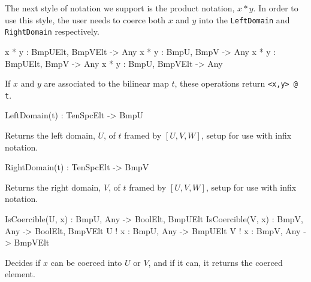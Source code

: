 The next style of notation we support is the product notation, $x*y$.
In order to use this style, the user needs to coerce both $x$ and $y$ into the \texttt{LeftDomain} and \texttt{RightDomain} respectively. 

\begin{intrinsics}
x * y : BmpUElt, BmpVElt -> Any
x * y : BmpU, BmpV -> Any
x * y : BmpUElt, BmpV -> Any
x * y : BmpU, BmpVElt -> Any
\end{intrinsics}

If $x$ and $y$ are associated to the bilinear map $t$, these operations return 
\texttt{<x,y> @ t}.

\begin{intrinsics}
LeftDomain(t) : TenSpcElt -> BmpU
\end{intrinsics}

Returns the left domain, $U$, of $t$ framed by $[U,V,W]$, 
setup for use with infix notation.

\begin{intrinsics}
RightDomain(t) : TenSpcElt -> BmpV
\end{intrinsics}

Returns the right domain, $V$, of $t$ framed by $[U,V,W]$,
setup for use with infix notation.

\begin{intrinsics}
IsCoercible(U, x) : BmpU, Any -> BoolElt, BmpUElt
IsCoercible(V, x) : BmpV, Any -> BoolElt, BmpVElt
U ! x : BmpU, Any -> BmpUElt
V ! x : BmpV, Any -> BmpVElt
\end{intrinsics}

Decides if $x$ can be coerced into $U$ or $V$, and if it can, it returns the coerced element.

